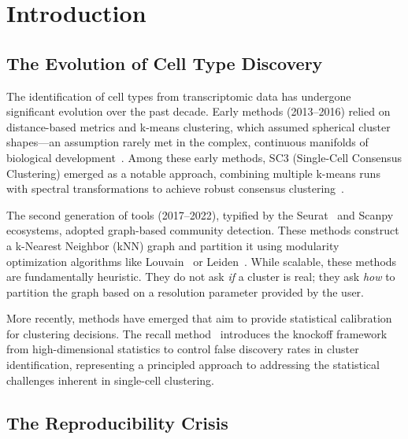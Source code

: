
\section{Introduction}
\label{sec:introduction}

\subsection{The Evolution of Cell Type Discovery}

The identification of cell types from transcriptomic data has undergone significant evolution over the past decade. Early methods (2013--2016) relied on distance-based metrics and k-means clustering, which assumed spherical cluster shapes---an assumption rarely met in the complex, continuous manifolds of biological development~\cite{kiselev2019challenges}. Among these early methods, SC3 (Single-Cell Consensus Clustering) emerged as a notable approach, combining multiple k-means runs with spectral transformations to achieve robust consensus clustering~\cite{kiselev2017sc3}.

The second generation of tools (2017--2022), typified by the Seurat~\cite{hao2021seurat} and Scanpy~\cite{wolf2018scanpy} ecosystems, adopted graph-based community detection. These methods construct a k-Nearest Neighbor (kNN) graph and partition it using modularity optimization algorithms like Louvain~\cite{blondel2008louvain} or Leiden~\cite{traag2019leiden}. While scalable, these methods are fundamentally heuristic. They do not ask \textit{if} a cluster is real; they ask \textit{how} to partition the graph based on a resolution parameter provided by the user.

More recently, methods have emerged that aim to provide statistical calibration for clustering decisions. The recall method~\cite{denadel2024recall} introduces the knockoff framework from high-dimensional statistics to control false discovery rates in cluster identification, representing a principled approach to addressing the statistical challenges inherent in single-cell clustering.

\subsection{The Reproducibility Crisis}

